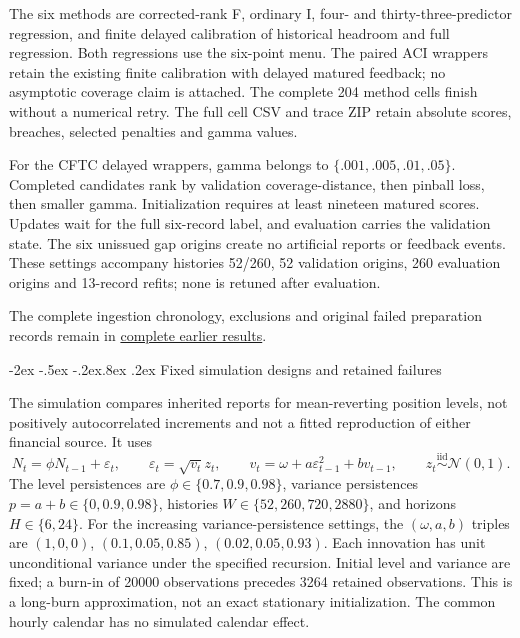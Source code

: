 \documentclass[10pt,a4paper]{article}
\makeatletter
\renewcommand\section{\@startsection{section}{1}{\z@}%
  {-2ex \@plus -.5ex \@minus -.2ex}{.8ex \@plus .2ex}%
  {\normalfont\large\bfseries}}
\makeatother
\begin{document}
The six methods are corrected-rank F, ordinary I, four- and thirty-three-predictor regression, and finite delayed calibration of historical headroom and full regression. Both regressions use the six-point menu. The paired ACI wrappers retain the existing finite calibration with delayed matured feedback; no asymptotic coverage claim is attached. The complete 204 method cells finish without a numerical retry. The full cell CSV and trace ZIP retain absolute scores, breaches, selected penalties and gamma values.

For the CFTC delayed wrappers, gamma belongs to $\{.001,.005,.01,.05\}$. Completed candidates rank by validation coverage-distance, then pinball loss, then smaller gamma. Initialization requires at least nineteen matured scores. Updates wait for the full six-record label, and evaluation carries the validation state. The six unissued gap origins create no artificial reports or feedback events. These settings accompany histories 52/260, 52 validation origins, 260 evaluation origins and 13-record refits; none is retuned after evaluation.

The complete ingestion chronology, exclusions and original failed preparation records remain in \href{https://github.com/ByronLi0207/financial-mathematics-paper-20261020/blob/submission-final/EXTENDED_RESULTS.md#asmbi-extended-s30}{complete earlier results}.

\FloatBarrier


\section{Fixed simulation designs and retained failures}\label{sup:simulation-original}\label{sup:simulation-primary}\label{sup:simulation-secondary}\label{sup:v8-mc}\label{sup:v9-legacy-mc}\label{sup:v9-stability}\label{sup:v10-menu}

The simulation compares inherited reports for mean-reverting position levels,
not positively autocorrelated increments and not a fitted reproduction of either
financial source. It uses
\[
N_t=\phi N_{t-1}+\varepsilon_t,\qquad
\varepsilon_t=\sqrt{v_t}z_t,\qquad
v_t=\omega+a\varepsilon_{t-1}^{2}+bv_{t-1},\qquad
z_t\stackrel{\mathrm{iid}}{\sim}\mathcal N(0,1).
\]
The level persistences are \(\phi\in\{0.7,0.9,0.98\}\), variance persistences
\(p=a+b\in\{0,0.9,0.98\}\), histories \(W\in\{52,260,720,2880\}\), and horizons
\(H\in\{6,24\}\). For the increasing variance-persistence settings, the
\((\omega,a,b)\) triples are \((1,0,0)\), \((0.1,0.05,0.85)\), \((0.02,0.05,0.93)\). Each innovation has unit unconditional
variance under the specified recursion. Initial level and variance are fixed;
a burn-in of 20000 observations precedes 3264 retained observations.
This is a long-burn approximation, not an exact stationary initialization.
The common hourly calendar has no simulated calendar effect.
\end{document}
